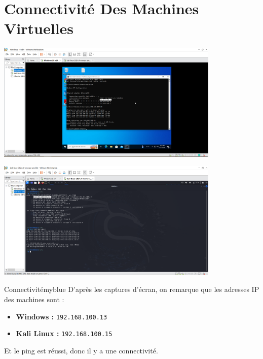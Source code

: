 \section{Connectivité Des Machines Virtuelles}

\begin{center}
    \includegraphics[width=0.8\textwidth]{Question/SC/1-ping1.PNG}
\end{center}

\vspace{0.25cm}

\begin{center}
    \includegraphics[width=0.8\textwidth]{Question/SC/1-ping2.PNG}
\end{center}

\vspace{0.35cm}

\begin{prettyBox}{Connectivité}{myblue}
D'après les captures d'écran, on remarque que les adresses IP des machines sont :
\begin{itemize}
    \item \textbf{Windows : } \texttt{192.168.100.13}
    \item \textbf{Kali Linux : } \texttt{192.168.100.15}
\end{itemize}
Et le ping est réussi, donc il y a une connectivité.
\end{prettyBox}

